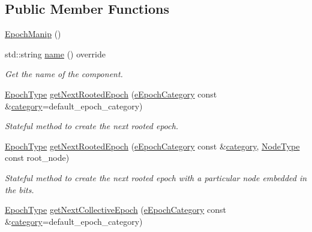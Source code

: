 \subsection*{Public Member Functions}
\begin{DoxyCompactItemize}
\item 
\hyperlink{structvt_1_1epoch_1_1_epoch_manip_a8dd8d684917d7b17f726512920955b43}{Epoch\+Manip} ()
\item 
std\+::string \hyperlink{structvt_1_1epoch_1_1_epoch_manip_a3dcf9b105619194fddde4e26a638b856}{name} () override
\begin{DoxyCompactList}\small\item\em Get the name of the component. \end{DoxyCompactList}\item 
\hyperlink{namespacevt_a985a5adf291c34a3ca263b3378388236}{Epoch\+Type} \hyperlink{structvt_1_1epoch_1_1_epoch_manip_a3260eeacd7e688f4e81e779df41ce912}{get\+Next\+Rooted\+Epoch} (\hyperlink{namespacevt_1_1epoch_a956abe0aceef0d10a988de8acb002c7c}{e\+Epoch\+Category} const \&\hyperlink{structvt_1_1epoch_1_1_epoch_manip_aa61d47033545df147c01036211c4cabe}{category}=default\+\_\+epoch\+\_\+category)
\begin{DoxyCompactList}\small\item\em Stateful method to create the next rooted epoch. \end{DoxyCompactList}\item 
\hyperlink{namespacevt_a985a5adf291c34a3ca263b3378388236}{Epoch\+Type} \hyperlink{structvt_1_1epoch_1_1_epoch_manip_a3c7bf7467b6e1c95a25f19bbcbdd9f17}{get\+Next\+Rooted\+Epoch} (\hyperlink{namespacevt_1_1epoch_a956abe0aceef0d10a988de8acb002c7c}{e\+Epoch\+Category} const \&\hyperlink{structvt_1_1epoch_1_1_epoch_manip_aa61d47033545df147c01036211c4cabe}{category}, \hyperlink{namespacevt_a866da9d0efc19c0a1ce79e9e492f47e2}{Node\+Type} const root\+\_\+node)
\begin{DoxyCompactList}\small\item\em Stateful method to create the next rooted epoch with a particular node embedded in the bits. \end{DoxyCompactList}\item 
\hyperlink{namespacevt_a985a5adf291c34a3ca263b3378388236}{Epoch\+Type} \hyperlink{structvt_1_1epoch_1_1_epoch_manip_aee02e9847be133585b586be614091f6e}{get\+Next\+Collective\+Epoch} (\hyperlink{namespacevt_1_1epoch_a956abe0aceef0d10a988de8acb002c7c}{e\+Epoch\+Category} const \&\hyperlink{structvt_1_1epoch_1_1_epoch_manip_aa61d47033545df147c01036211c4cabe}{category}=default\+\_\+epoch\+\_\+category)

\end{DoxyCompactItemize}
